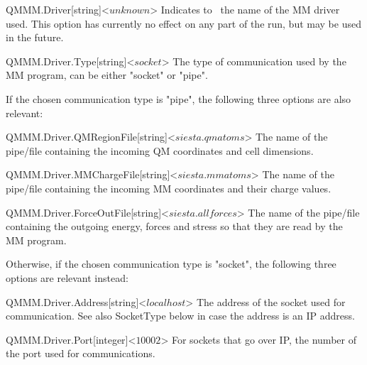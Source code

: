  \begin{fdfentry}{QMMM.Driver}[string]<$unknown$>
  Indicates to \siesta\ the name of the MM driver used. This
  option has currently no effect on any part of the run, but
  may be used in the future.

 \end{fdfentry}

 \begin{fdfentry}{QMMM.Driver.Type}[string]<$socket$>
  The type of communication used by the MM program, can be
  either "socket" or "pipe".

 \end{fdfentry}

 If the chosen communication type is "pipe", the following
 three options are also relevant:

 \begin{fdfentry}{QMMM.Driver.QMRegionFile}[string]<$siesta.qmatoms$>
  The name of the pipe/file containing the incoming QM coordinates
  and cell dimensions.

 \end{fdfentry}

 \begin{fdfentry}{QMMM.Driver.MMChargeFile}[string]<$siesta.mmatoms$>
  The name of the pipe/file containing the incoming MM coordinates
  and their charge values.

 \end{fdfentry}

 \begin{fdfentry}{QMMM.Driver.ForceOutFile}[string]<$siesta.allforces$>
  The name of the pipe/file containing the outgoing energy, forces and
  stress so that they are read by the MM program.

 \end{fdfentry}

 Otherwise, if the chosen communication type is "socket", the following
 three options are relevant instead:

 \begin{fdfentry}{QMMM.Driver.Address}[string]<$localhost$>
  The address of the socket used for communication. See also SocketType
  below in case the address is an IP address.

 \end{fdfentry}

 \begin{fdfentry}{QMMM.Driver.Port}[integer]<$10002$>
  For sockets that go over IP, the number of the port used for communications.

 \end{fdfentry}

